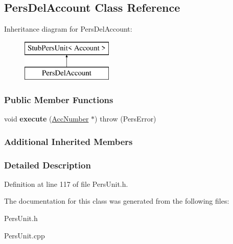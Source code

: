 \hypertarget{classPersDelAccount}{\subsection{Pers\-Del\-Account Class Reference}
\label{d6/d74/classPersDelAccount}
}
Inheritance diagram for Pers\-Del\-Account\-:\begin{figure}[H]
\begin{center}
\leavevmode
\includegraphics[height=2.000000cm]{d6/d74/classPersDelAccount}
\end{center}
\end{figure}
\subsubsection*{Public Member Functions}
\begin{DoxyCompactItemize}
\item 
\hypertarget{classPersDelAccount_a711d6dc413c1bc56ec70225ca6734c67}{void {\bfseries execute} (\hyperlink{classAccNumber}{Acc\-Number} $\ast$)  throw (\-Pers\-Error)}\label{d6/d74/classPersDelAccount_a711d6dc413c1bc56ec70225ca6734c67}

\end{DoxyCompactItemize}
\subsubsection*{Additional Inherited Members}


\subsubsection{Detailed Description}


Definition at line 117 of file Pers\-Unit.\-h.



The documentation for this class was generated from the following files\-:\begin{DoxyCompactItemize}
\item 
Pers\-Unit.\-h\item 
Pers\-Unit.\-cpp\end{DoxyCompactItemize}
